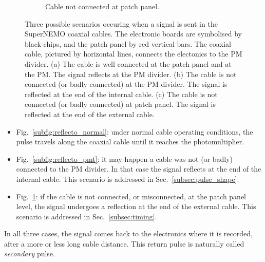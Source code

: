 \begin{figure}[h!]
\begin{subfigure}[b]{0.3\textwidth}
    \captionsetup{justification=centering}
    \caption{Cable not connected at patch panel.
      \label{subfig:reflecto_pp}}
  \end{subfigure}
  \caption{Three possible scenarios occuring when a signal is sent in the SuperNEMO coaxial cables.
    The electronic boards are symbolised by black chips, and the patch panel by red vertical bars.
    The coaxial cable, pictured by horizontal lines, connects the electonics to the PM divider.
    (a) The cable is well connected at the patch panel and at the PM. The signal reflects at the PM divider.
    (b) The cable is not connected (or badly connected) at the PM divider. The signal is reflected at the end of the internal cable.
    (c) The cable is not connected (or badly connected) at patch panel. The signal is reflected at the end of the external cable.
    \label{fig:reflecto_scheme}}
\end{figure}
\begin{itemize}
\item Fig.~\ref{subfig:reflecto_normal}: under normal cable operating conditions, the pulse travels along the coaxial cable until it reaches the photomultiplier.
\item Fig.~\ref{subfig:reflecto_pmt}: it may happen a cable was not (or badly) connected to the PM divider.
  In that case the signal reflects at the end of the internal cable.
  This scenario is addressed in Sec.~\ref{subsec:pulse_shape}.
\item Fig.~\ref{subfig:reflecto_pp}: if the cable is not connected, or misconnected, at the patch panel level, the signal undergoes a reflection at the end of the external cable.
  This scenario is addressed in Sec.~\ref{subsec:timing}.
\end{itemize}
In all three cases, the signal comes back to the electronics where it is recorded, after a more or less long cable distance.
This return pulse is naturally called \emph{secondary} pulse.

